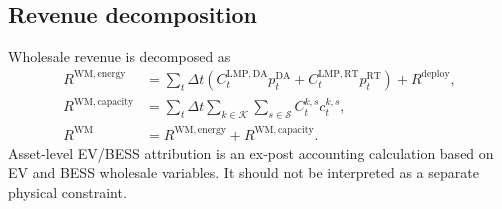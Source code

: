 \documentclass[final,5p,times]{elsarticle}
\newcommand{\DeltaT}{\Delta t}
\newcommand{\DA}{\mathrm{DA}}
\newcommand{\RT}{\mathrm{RT}}
\newcommand{\WM}{\mathrm{WM}}
\newcommand{\energy}{\mathrm{energy}}
\newcommand{\capacity}{\mathrm{capacity}}
\newcommand{\calK}{\mathcal{K}}
\newcommand{\calS}{\mathcal{S}}
\begin{document}
\subsection{Revenue decomposition}
Wholesale revenue is decomposed as
\begin{align}
R^{\WM,\energy}&=\sum_t\DeltaT\left(C_t^{\mathrm{LMP},\DA}p_t^{\DA}+C_t^{\mathrm{LMP},\RT}p_t^{\RT}\right)+R^{\mathrm{deploy}},\label{eq:app_energy_rev}\\
R^{\WM,\capacity}&=\sum_t\DeltaT\sum_{k\in\calK}\sum_{s\in\calS}C_t^{k,s}c_t^{k,s},\label{eq:app_capacity_rev}\\
R^{\WM}&=R^{\WM,\energy}+R^{\WM,\capacity}.\label{eq:app_total_rev}
\end{align}
Asset-level EV/BESS attribution is an ex-post accounting calculation based on EV and BESS wholesale variables. It should not be interpreted as a separate physical constraint.




\balance


\end{document}
